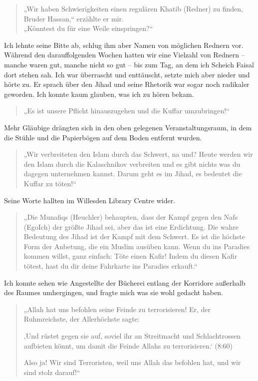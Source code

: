 \documentclass[12pt]{memoir}
\def\/{\discretionary{/}{}{/}}
\begin{document}
\begin{quote}
„Wir haben Schwierigkeiten einen regulären Khatib (Redner) zu finden,
Bruder Hassan,“ erzählte er mir.\\
„Könntest du für eine Weile einspringen?“
\end{quote}

Ich lehnte seine Bitte ab,
schlug ihm aber Namen von möglichen Rednern vor.
Während den darauffolgenden Wochen hatten wir eine Vielzahl von Rednern –
manche waren gut, manche nicht so gut –
bis zum Tag, an dem ich Scheich Faisal dort stehen sah.
Ich war überrascht und enttäuscht, setzte mich aber nieder und hörte zu.
Er sprach über den Jihad und seine Rhetorik
war sogar noch radikaler geworden.
Ich konnte kaum glauben, was ich zu hören bekam.

\begin{quote}
„Es ist unsere Pflicht hinauszugehen und die Kuffar umzubringen!“
\end{quote}

Mehr Gläubige drängten sich in den oben gelegenen Veranstaltungsraum,
in dem die Stühle und die Papierbögen auf dem Boden entfernt wurden.

\begin{quote}
„Wir verbreiteten den Islam durch das Schwert, na und?
Heute werden wir den Islam durch die Kalaschnikov verbreiten
und es gibt nichts was du dagegen unternehmen kannst.
Darum geht es im Jihad, es bedeutet die Kuffar zu töten!“
\end{quote}

Seine Worte hallten im Willesden Library Centre wider.

\begin{quote}
„Die Munafiqs (Heuchler) behaupten,
dass der Kampf gegen den Nafs (Ego\/Ich) der größte Jihad sei,
aber das ist eine Erdichtung.
Die wahre Bedeutung des Jihad ist der Kampf mit dem Schwert.
Es ist die höchste Form der Anbetung, die ein Muslim ausüben kann.
Wenn du ins Paradies kommen willst, ganz einfach:
Töte einen Kafir!
Indem du diesen Kafir tötest,
hast du dir deine Fahrkarte ins Paradies erkauft.“
\end{quote}

Ich konnte sehen wie Angestellte der Bücherei
entlang der Korridore außerhalb des Raumes umhergingen,
und fragte mich was sie wohl gedacht haben.

\begin{quote}
„Allah hat uns befohlen seine Feinde zu terrorisieren!
Er, der Ruhmreichste, der Allerhöchste sagte:

‚Und rüstet gegen sie auf, soviel ihr an Streitmacht
und Schlachtrossen aufbieten könnt,
um damit die Feinde Allahs zu terrorisieren.‘
(8:60)

Also ja! Wir sind Terroristen,
weil uns Allah das befohlen hat, und wir sind stolz darauf!“
\end{quote}
\end{document}
